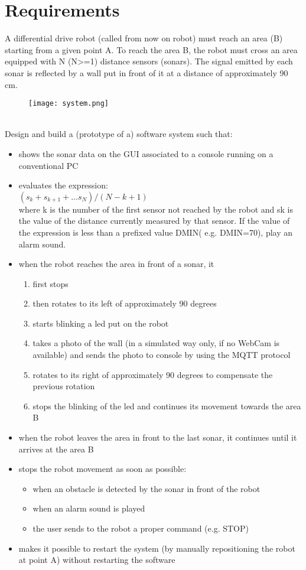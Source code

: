 \section{Requirements}
A differential drive robot (called from now on robot) must reach an area (B) starting from a given point A. To reach the area B, the robot must cross an area equipped with N (N>=1) distance sensors (sonars). The signal emitted by each sonar is reflected by a wall put in front of it at a distance of approximately 90 cm.
\begin{figure}[h]
	\centering
	\texttt{[image: system.png]}
\end{figure}
\\
Design and build a (prototype of a) software system such that:
\begin{itemize}
	\item shows the sonar data on the GUI associated to a console running on a conventional PC
	\item evaluates the expression: \\
			$ (s_{k} + s_{k+1} + ... s_{N}) / (N-k+1) $ \\
			where k is the number of the first sensor not reached by the robot and sk is the value of the distance currently measured by that sensor. If the value of the expression is less than a prefixed value DMIN( e.g. DMIN=70), play an alarm sound.
	\item when the robot reaches the area in front of a sonar, it
			\begin{enumerate}
				\item first stops
				\item then rotates to its left of approximately 90 degrees
				\item starts blinking a led put on the robot
				\item takes a photo of the wall (in a simulated way only, if no WebCam is available) and sends the photo to console by using the MQTT protocol
				\item rotates to its right of approximately 90 degrees to compensate the previous rotation
				\item stops the blinking of the led and continues its movement towards the area B
			\end{enumerate}
	\item when the robot leaves the area in front to the last sonar, it continues until it arrives at the area B
	\item stops the robot movement as soon as possible:
	\begin{itemize}
		\item when an obstacle is detected by the sonar in front of the robot
		\item when an alarm sound is played
		\item the user sends to the robot a proper command (e.g. STOP)
	\end{itemize}
	\item makes it possible to restart the system (by manually repositioning the robot at point A) without restarting the software
\end{itemize}
